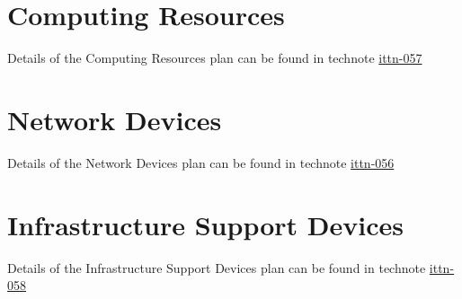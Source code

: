 \section{Computing Resources}

Details of the Computing Resources plan can be found in technote \href{http://ittn-057.lsst.io}{ittn-057}

\section{Network Devices}

Details of the Network Devices plan can be found in technote \href{http://ittn-056.lsst.io}{ittn-056}

\section{Infrastructure Support Devices}

Details of the Infrastructure Support Devices plan can be found in technote \href{http://ittn-058.lsst.io}{ittn-058}